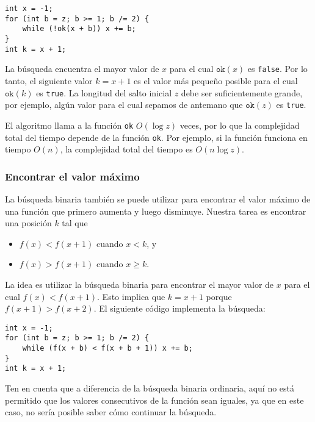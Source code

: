 \begin{lstlisting}
int x = -1;
for (int b = z; b >= 1; b /= 2) {
    while (!ok(x + b)) x += b;
}
int k = x + 1;
\end{lstlisting}

La búsqueda encuentra el mayor valor de $x$ para el cual
$\texttt{ok}(x)$ es \texttt{false}.
Por lo tanto, el siguiente valor $k=x+1$
es el valor más pequeño posible para el cual
$\texttt{ok}(k)$ es \texttt{true}.
La longitud del salto inicial $z$ debe ser
suficientemente grande, por ejemplo, algún valor
para el cual sepamos de antemano que $\texttt{ok}(z)$ es \texttt{true}.

El algoritmo llama a la función \texttt{ok}
$O(\log z)$ veces, por lo que la complejidad total del tiempo
depende de la función \texttt{ok}.
Por ejemplo, si la función funciona en tiempo $O(n)$,
la complejidad total del tiempo es $O(n \log z)$.

\subsubsection{Encontrar el valor máximo}

La búsqueda binaria también se puede utilizar para encontrar
el valor máximo de una función que primero aumenta y luego disminuye.
Nuestra tarea es encontrar una posición $k$ tal que

\begin{itemize}
    \item
          $f(x)<f(x+1)$ cuando $x<k$, y
    \item
          $f(x)>f(x+1)$ cuando $x \ge k$.
\end{itemize}

La idea es utilizar la búsqueda binaria
para encontrar el mayor valor de $x$
para el cual $f(x)<f(x+1)$.
Esto implica que $k=x+1$
porque $f(x+1)>f(x+2)$.
El siguiente código implementa la búsqueda:

\begin{lstlisting}
int x = -1;
for (int b = z; b >= 1; b /= 2) {
    while (f(x + b) < f(x + b + 1)) x += b;
}
int k = x + 1;
\end{lstlisting}

Ten en cuenta que a diferencia de la búsqueda binaria ordinaria,
aquí no está permitido que los valores consecutivos
de la función sean iguales, ya que
en este caso, no sería posible saber
cómo continuar la búsqueda.
